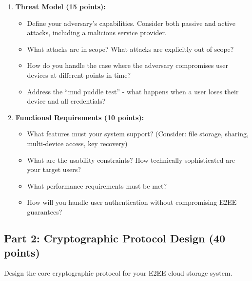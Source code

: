 \documentclass[10pt,a4paper,american]{article}
\begin{document}
\begin{enumerate}
	\item \textbf{Threat Model (15 points):}
	      \begin{itemize}
		      \item Define your adversary's capabilities. Consider both passive and active attacks, including a malicious service provider.
		      \item What attacks are in scope? What attacks are explicitly out of scope?
		      \item How do you handle the case where the adversary compromises user devices at different points in time?
		      \item Address the ``mud puddle test'' - what happens when a user loses their device and all credentials?
	      \end{itemize}

	\item \textbf{Functional Requirements (10 points):}
	      \begin{itemize}
		      \item What features must your system support? (Consider: file storage, sharing, multi-device access, key recovery)
		      \item What are the usability constraints? How technically sophisticated are your target users?
		      \item What performance requirements must be met?
		      \item How will you handle user authentication without compromising E2EE guarantees?
	      \end{itemize}
\end{enumerate}

\subsection{Part 2: Cryptographic Protocol Design (40 points)}

Design the core cryptographic protocol for your E2EE cloud storage system.
\end{document}
